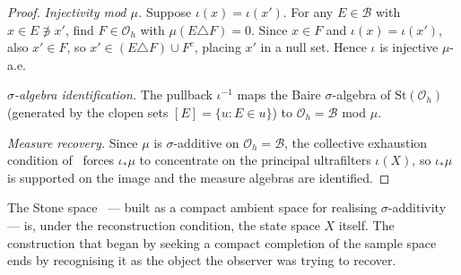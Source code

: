 \begin{proof}
\emph{Injectivity mod $\mu$.}  Suppose $\iota(x) = \iota(x')$.  For any
$E \in \mathcal{B}$ with $x \in E \not\ni x'$, find $F \in \mathcal{O}_h$
with $\mu(E \triangle F) = 0$.  Since $x \in F$ and $\iota(x) = \iota(x')$,
also $x' \in F$, so $x' \in (E \triangle F) \cup F^c$, placing $x'$ in a
null set.  Hence $\iota$ is injective $\mu$-a.e.

\emph{$\sigma$-algebra identification.}  The pullback $\iota^{-1}$ maps the
Baire $\sigma$-algebra of $\mathrm{St}(\mathcal{O}_h)$ (generated by the
clopen sets $[E] = \{u : E \in u\}$) to $\mathcal{O}_h = \mathcal{B}$ mod
$\mu$.

\emph{Measure recovery.}  Since $\mu$ is $\sigma$-additive on
$\mathcal{O}_h = \mathcal{B}$, the collective exhaustion condition
of~\cite{mahon_paper1} forces $\iota_*\mu$ to concentrate on the principal
ultrafilters $\iota(X)$, so $\iota_*\mu$ is supported on the image and the
measure algebras are identified.
\end{proof}

\noindent The Stone space~\cite{mahon_paper1} — built as a compact ambient
space for realising $\sigma$-additivity — is, under the reconstruction condition,
the state space $X$ itself.  The construction that began by seeking
a compact completion of the sample space ends by recognising it as the object
the observer was trying to recover.


